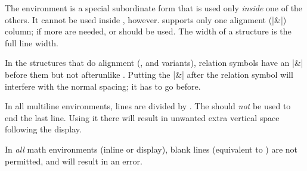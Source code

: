\documentclass[leqno,titlepage,openany]{amsldoc}[1999/12/13]
\makeatletter
\let\oldcs\cs
\def\cs#1{\texorpdfstring{\oldcs{#1}}{\@backslashchar\@backslashchar#1}}
\let\cn\cs
\makeatother
\begin{document}
The  environment is a special subordinate form that is used
only \emph{inside} one of the others. It cannot be used inside
, however.  supports only one alignment (|&|)
column; if more are needed,  or  should be
used. The width of a  structure is the full line width.

In the structures that do alignment (,  and
variants), relation symbols have an |&| before them but not
after\mdash unlike . Putting the |&| after the
relation symbol will interfere with the normal spacing; it has to go
before.

In all multiline environments, lines are divided by \cn{\\}.  The \cn{\\}
should \emph{not} be used to end the last line.  Using it there will
result in unwanted extra vertical space following the display.

In \emph{all} math environments (inline or display), blank lines
(equivalent to \cn{par}) are not permitted, and will result in an error.
\end{document}
